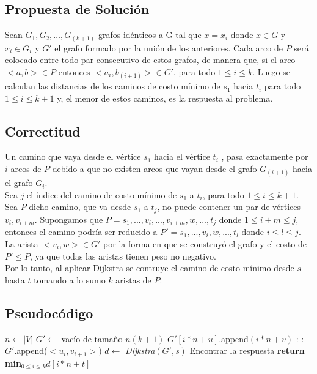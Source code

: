 \documentclass[a4paper,10pt]{article}
\begin{document}
	\subsection{Propuesta de Soluci\'on}
	Sean $G_1,G_2,…,G_{(k+1)}$ grafos idénticos a G tal que  $x = x_i$ donde $x \in G$ y $x_i \in G_i$ y $G'$  el grafo formado por la unión de los anteriores. Cada arco de $P$ será colocado entre todo par consecutivo de estos grafos, de manera que, si el arco $<a,b> \in P$ entonces $<a_i,b_{(i+1)}> \in G'$, para todo $1 \leq i \leq k$. Luego se calculan las distancias de los caminos de costo mínimo de $s_1$ hacia $t_i$  para todo $1 \leq i \leq k + 1$ y, el menor de estos caminos, es la respuesta al problema.
	\subsection{Correctitud}
	Un camino que vaya desde el vértice $s_1$ hacia el vértice $t_i$ , pasa exactamente por $i$ arcos de $P$ debido a que no existen arcos que vayan desde el grafo $G_{(i+1)}$ hacia el grafo $G_i$. 
	\\Sea $j$ el índice del camino de costo mínimo de $s_1$ a $t_i$, para todo $1\leq i \leq k + 1$.
	\\Sea $P$ dicho camino, que va desde $s_1$  a $t_j$, no puede contener un par de vértices $v_i, v_{i+m}$. Supongamos que $P = s_1, ... , v_i, ... , v_{i+m}, w, ... , t_j$ donde $1 \leq i + m \leq j$, entonces el camino podr\'ia ser reducido a $P' = s_1, ... , v_i, w, ... , t_l$ donde $i \leq l \leq j$. La arista $<v_i, w> \in G'$ por la forma en que se construy\'o el grafo y el costo de $P' \leq P$, ya que todas las aristas tienen peso no negativo.
	\\Por lo tanto, al aplicar Dijkstra se contruye el camino de costo m\'inimo desde $s$ hasta $t$ tomando a lo sumo $k$ aristas de $P$. 
	\subsection{Pseudoc\'odigo}
\begin{algorithm}[H] 
	\begin{algorithmic}[1]
		\State $n \gets |V|$
		\State $G' \gets$ vac\'io de tama\~no $n(k+1)$		
				\State \textnormal{$G'[i*n+u]$.append$(i*n+v)$}
			\EndFor
		\EndFor
		:
			:				
				\State $G'$\textnormal{.append($<u_i, v_{i+1}>$)}
			\EndFor
		\EndFor
		\State $d \gets$ \textnormal{\emph{Dijkstra}$(G', s)$}	\Comment \textnormal{Encontrar la respuesta}
		\State \bf{return} \textnormal{min$_{0\leq i \leq k}d[i*n+t]$}
		
	\end{algorithmic}
\end{algorithm}
\end{document}
